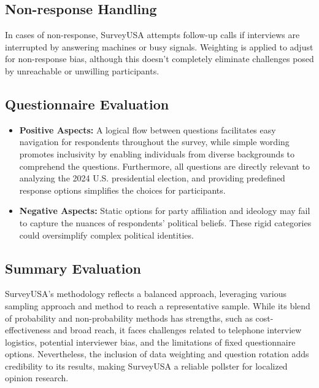 \documentclass[
  letterpaper,
  DIV=11,
  numbers=noendperiod]{scrartcl}
\providecommand{\tightlist}{%
  \setlength{\itemsep}{0pt}\setlength{\parskip}{0pt}}\usepackage{longtable,booktabs,array}
\begin{document}
\subsection{\texorpdfstring{Non-response Handling\\
}{Non-response Handling }}\label{non-response-handling}

In cases of non-response, SurveyUSA attempts follow-up calls if
interviews are interrupted by answering machines or busy signals.
Weighting is applied to adjust for non-response bias, although this
doesn't completely eliminate challenges posed by unreachable or
unwilling participants.\\

\subsection{\texorpdfstring{Questionnaire Evaluation\\
}{Questionnaire Evaluation }}\label{questionnaire-evaluation}

\begin{itemize}
\tightlist
\item
  \textbf{Positive Aspects:} A logical flow between questions
  facilitates easy navigation for respondents throughout the survey,
  while simple wording promotes inclusivity by enabling individuals from
  diverse backgrounds to comprehend the questions. Furthermore, all
  questions are directly relevant to analyzing the 2024 U.S.
  presidential election, and providing predefined response options
  simplifies the choices for participants.\\
\item
  \textbf{Negative Aspects:} Static options for party affiliation and
  ideology may fail to capture the nuances of respondents' political
  beliefs. These rigid categories could oversimplify complex political
  identities.\\
\end{itemize}

\subsection{\texorpdfstring{Summary Evaluation\\
}{Summary Evaluation }}\label{summary-evaluation}

SurveyUSA's methodology reflects a balanced approach, leveraging various
sampling approach and method to reach a representative sample. While its
blend of probability and non-probability methods has strengths, such as
cost-effectiveness and broad reach, it faces challenges related to
telephone interview logistics, potential interviewer bias, and the
limitations of fixed questionnaire options. Nevertheless, the inclusion
of data weighting and question rotation adds credibility to its results,
making SurveyUSA a reliable pollster for localized opinion research.
\end{document}
